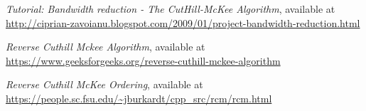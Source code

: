 \documentclass[letterpaper,12pt]{article}
\begin{document}

\begin{thebibliography}{99}

 \emph{Tutorial: Bandwidth reduction - The CutHill-McKee Algorithm},  available at \\
\url{http://ciprian-zavoianu.blogspot.com/2009/01/project-bandwidth-reduction.html}
	
 \emph{Reverse Cuthill Mckee Algorithm},  available at \\
\url{https://www.geeksforgeeks.org/reverse-cuthill-mckee-algorithm}

 \emph{Reverse Cuthill McKee Ordering},  available at \\
\url{https://people.sc.fsu.edu/~jburkardt/cpp_src/rcm/rcm.html}
	
\end{thebibliography}
\end{document}
